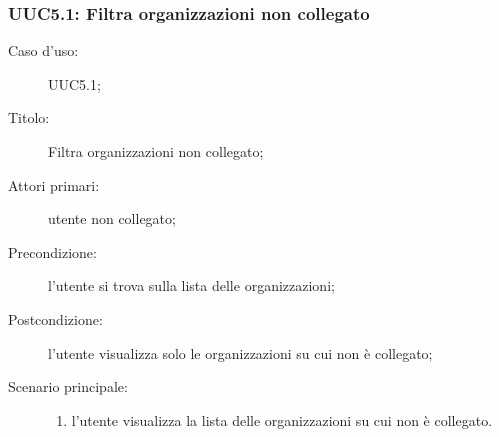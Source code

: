 \documentclass[../../../analisi-dei-requisiti.tex]{subfiles}
\begin{document}
\subsubsection{UUC5.1: Filtra organizzazioni non collegato}%
\begin{description}
  \item[Caso d’uso:] UUC5.1;
  \item[Titolo:] Filtra organizzazioni non collegato;
  \item[Attori primari:] utente non collegato;
  \item[Precondizione:] l'utente si trova sulla lista delle organizzazioni;
  \item[Postcondizione:] l'utente visualizza solo le organizzazioni su cui non è collegato;
  \item[Scenario principale:]
        \begin{enumerate}
          \item l'utente visualizza la lista delle organizzazioni su cui non è collegato.
        \end{enumerate}
\end{description}
\end{document}
